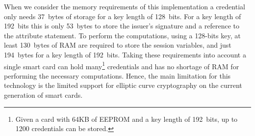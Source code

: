 When we consider the memory requirements of this implementation a credential only
needs 37~bytes of storage for a key length of 128~bits. For a key length of 192~bits 
this is only 53~bytes to store the issuer's signature and a reference to the attribute 
statement. To perform the computations, using a 128-bits key, at least 130~bytes of RAM 
are required to store the session variables, and just 194~bytes for a key length of 192~bits.
Taking these requirements into account a single smart card can hold many\footnote{Given 
a card with 64KB of EEPROM and a key length of 192~bits, up to 1200 credentials can be 
stored.} credentials and has no shortage of RAM for performing the necessary 
computations. Hence, the main limitation for this technology is the limited support for
elliptic curve cryptography on the current generation of smart cards.

%
%

